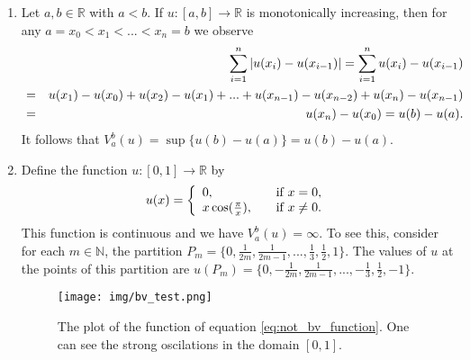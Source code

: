     \begin{example} %
    \label{ex:total_variation_one_d}

        \begin{enumerate}
            \item Let $a, b \in \mathbb{R}$ with $a < b$. If $u: [a, b] \longrightarrow \mathbb{R}$ is monotonically increasing, then for any $a = x_{0} < x_{1} < ... < x_{n} = b$ we observe
                \begin{eqnarray}
                    &&\sum_{i = 1}^{n} |u(x_{i}) - u(x_{i-1})| = \sum_{i = 1}^{n} u(x_{i}) - u(x_{i-1}) \notag \\
                    &=& u(x_{1}) - u(x_{0}) + u(x_{2}) - u(x_{1}) + ... + u(x_{n-1}) - u(x_{n-2}) + u(x_{n}) - u(x_{n-1}) \notag \\
                    &=& u(x_{n}) - u(x_{0}) = u(b) - u(a). \notag
                \end{eqnarray}
            It follows that $V^{b}_{a}(u) = \sup \{u(b) - u(a)\} = u(b) - u(a)$.
            \item Define the function $u: [0, 1] \longrightarrow \mathbb{R}$ by
                \begin{equation}
                    u(x) =
                    \left\{
                        \begin{array}{l l}
                            0,                      & \quad \text{if $x = 0$}, \\
                            x \cos(\frac{\pi}{x}),  & \quad \text{if $x \ne 0$}.
                        \end{array}
                    \right.
                    \label{eq:not_bv_function}
                \end{equation}
            This function is continuous and we have $V^{b}_{a}(u) = \infty$. To see this, consider for each $m \in \mathbb{N}$, the partition $P_{m} = \{ 0, \frac{1}{2m}, \frac{1}{2m-1}, ..., \frac{1}{3}, \frac{1}{2}, 1 \}$. The values of $u$ at the points of this partition are $u(P_{m}) = \{ 0, -\frac{1}{2m}, \frac{1}{2m-1}, ..., -\frac{1}{3}, \frac{1}{2}, -1 \}$.


        \begin{figure}[ht]
            \centering
            \texttt{[image: img/bv\_test.png]}
            \caption{The plot of the function of equation \ref{eq:not_bv_function}. One can see the strong oscilations in the domain $[0, 1]$.}
            \label{fig:plot_of_not_bv_function}
        \end{figure}


\end{enumerate}
\end{example}
